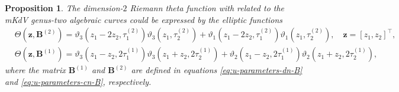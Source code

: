 \documentclass[11pt,reqno]{amsart}
\newtheorem{prop}{Proposition}
\numberwithin{equation}{section}
\begin{document}
\begin{prop}\label{prop:Riemann-2-1}
	The dimension-$2$ Riemann theta function with related to the mKdV genus-two algebraic curves could be expressed by the elliptic functions 
	\begin{equation}\label{eq:formula-Rieman-shift-1}
		\begin{split}
			&\Theta(\mathbf{z}, \mathbf{B}^{(2)})=\vartheta_3(z_1-2z_2, \tau^{(2)}_1)\vartheta_3(z_1, \tau^{(2)}_2)+\vartheta_1(z_1-2z_2, \tau^{(2)}_1)\vartheta_1(z_1, \tau^{(2)}_2), \quad
			\mathbf{z}=[z_1,z_2]^{\top}, \\
			& \Theta(\mathbf{z}, \mathbf{B}^{(1)} )=\vartheta_3(z_1-z_2,2  \tau^{(1)}_1)\vartheta_3(z_1+z_2,2  \tau^{(1)}_2)+\vartheta_2(z_1-z_2,2  \tau^{(1)}_1)\vartheta_2(z_1+z_2,2  \tau^{(1)}_2),
		\end{split}
	\end{equation}
	where the matrix $\mathbf{B}^{(1)}$ and $ \mathbf{B}^{(2)}$ are defined in equations \eqref{eq:u-parameters-dn-B} and \eqref{eq:u-parameters-cn-B}, respectively.
\end{prop}
\end{document}

